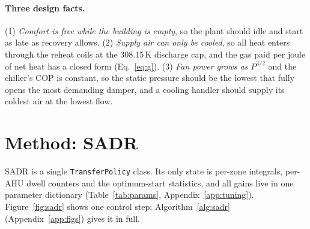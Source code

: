 \documentclass{article}
\begin{document}
\paragraph{Three design facts.} (1) \emph{Comfort is free while the building is empty}, so the plant should idle and start as late as recovery allows. (2) \emph{Supply air can only be cooled}, so all heat enters through the reheat coils at the 308.15\,K discharge cap, and the gas paid per joule of net heat has a closed form (Eq.~\ref{eq:g}). (3) \emph{Fan power grows as $P^{3/2}$} and the chiller's COP is constant, so the static pressure should be the lowest that fully opens the most demanding damper, and a cooling handler should supply its coldest air at the lowest flow.

\section{Method: SADR}
\label{sec:method}

SADR is a single \texttt{TransferPolicy} class. Its only state is per-zone integrals, per-AHU dwell counters and the optimum-start statistics, and all gains live in one parameter dictionary (Table~\ref{tab:params}, Appendix~\ref{app:tuning}). Figure~\ref{fig:sadr} shows one control step; Algorithm~\ref{alg:sadr} (Appendix~\ref{app:figs}) gives it in full.
\end{document}
